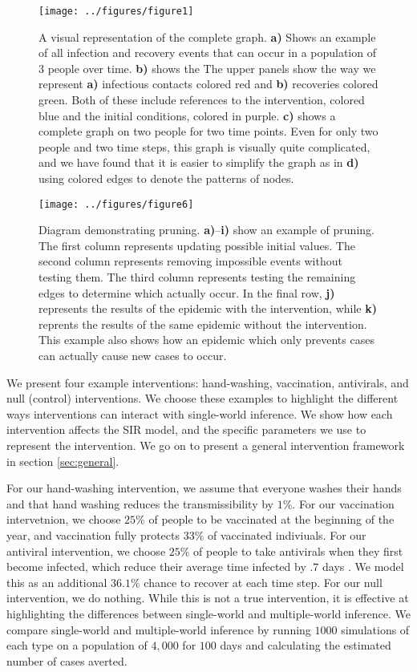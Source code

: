 \documentclass[openacc]{rsproca_new}%
\begin{document}
\begin{figure}\label{fig:network-example}
\texttt{[image: ../figures/figure1]} %
\caption{A visual representation of the complete graph.  \textbf{a)} Shows an example of all infection and recovery events that can occur in a population of $3$ people over time.  \textbf{b)} shows the The upper panels show the way we represent \textbf{a)} infectious contacts colored red and \textbf{b)} recoveries colored green.  Both of these include references to the intervention, colored blue and the initial conditions, colored in purple.  \textbf{c)} shows a complete graph on two people for two time points.  Even for only two people and two time steps, this graph is visually quite complicated, and we have found that it is easier to simplify the graph as in \textbf{d)} using colored edges to denote the patterns of nodes.}
\end{figure}

\begin{figure}
\texttt{[image: ../figures/figure6]} %
\caption{Diagram demonstrating pruning. \textbf{a)}--\textbf{i)} show an example of pruning.  The first column represents updating possible initial values.  The second column represents removing impossible events without testing them.  The third column represents testing the remaining edges to determine which actually occur.  In the final row, \textbf{j)} represents the results of the epidemic with the intervention, while \textbf{k)} reprents the results of the same epidemic without the intervention.  This example also shows how an epidemic which only prevents cases can actually cause new cases to occur.}
\end{figure}

We present four example interventions: hand-washing, vaccination, antivirals, and null (control) interventions.
We choose these examples to highlight the different ways interventions can interact with single-world inference.
We show how each intervention affects the SIR model, and the specific parameters we use to represent the intervention.
We go on to present a general intervention framework in section \ref{sec:general}.

For our hand-washing intervention, we assume that everyone washes their hands and that hand washing reduces the transmissibility by $1\%$.
For our vaccination intervetnion, we choose $25\%$ of people to be vaccinated at the beginning of the year, and vaccination fully protects $33\%$ of vaccinated indiviuals.
For our antiviral intervention, we choose $25\%$ of people to take antivirals when they first become infected, which reduce their average time infected by $.7$ days \cite{}.
We model this as an additional $36.1\%$ chance to recover at each time step.
For our null intervention, we do nothing.
While this is not a true intervention, it is effective at highlighting the differences between single-world and multiple-world inference.
We compare single-world and multiple-world inference by running $1000$ simulations of each type on a population of $4,000$ for $100$ days and calculating the estimated number of cases averted.
\end{document}
